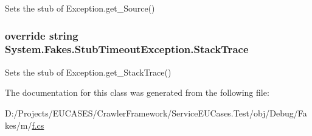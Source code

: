 Sets the stub of Exception.\-get\-\_\-\-Source()

\hypertarget{class_system_1_1_fakes_1_1_stub_timeout_exception_a52c1881a2b01053d6ff6fca36c96ca43}{
\subsubsection[{Stack\-Trace}]{\setlength{\rightskip}{0pt plus 5cm}override string System.\-Fakes.\-Stub\-Timeout\-Exception.\-Stack\-Trace\hspace{0.3cm}{\ttfamily [get]}}}\label{class_system_1_1_fakes_1_1_stub_timeout_exception_a52c1881a2b01053d6ff6fca36c96ca43}


Sets the stub of Exception.\-get\-\_\-\-Stack\-Trace()



The documentation for this class was generated from the following file\-:\begin{DoxyCompactItemize}
\item 
D\-:/\-Projects/\-E\-U\-C\-A\-S\-E\-S/\-Crawler\-Framework/\-Service\-E\-U\-Cases.\-Test/obj/\-Debug/\-Fakes/m/\hyperlink{m_2f_8cs}{f.\-cs}\end{DoxyCompactItemize}
